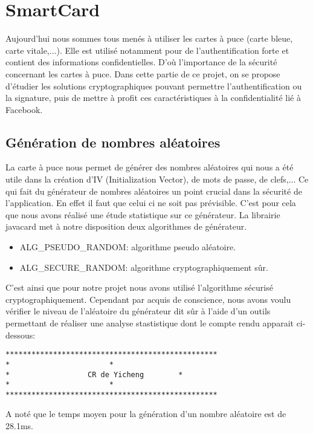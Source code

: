 \documentclass[a4paper,11pt,french]{article}
\begin{document}
\section{SmartCard}
Aujourd'hui nous sommes tous menés à utiliser les cartes à puce (carte bleue, carte vitale,...). 
Elle est utilisé notamment pour de l'authentification forte et contient des informations confidentielles.
D'où l'importance de la sécurité concernant les cartes à puce.
Dans cette partie de ce projet, on se propose d'étudier les solutions cryptographiques pouvant
permettre l'authentification ou la signature, puis de mettre à profit ces caractéristiques
à la confidentialité lié à Facebook.


\subsection{Génération de nombres aléatoires}
La carte à puce nous permet de générer des nombres aléatoires qui nous a été utile dans la création d'IV (Initialization Vector),
de mots de passe, de clefs,... Ce qui fait du générateur de nombres aléatoires un point crucial dans la sécurité de l'application.
En effet il faut que celui ci ne soit pas prévisible. C'est pour cela que nous avons réalisé une étude statistique sur ce générateur.
La librairie javacard met à notre disposition deux algorithmes de générateur. 
\begin{itemize} 
	\item ALG\_PSEUDO\_RANDOM: algorithme pseudo aléatoire.
	\item ALG\_SECURE\_RANDOM: algorithme cryptographiquement sûr.
\end{itemize}

C'est ainsi que pour notre projet nous avons utilisé l'algorithme sécurisé cryptographiquement. Cependant
par acquis de conscience, nous avons voulu vérifier le niveau de l'aléatoire du générateur dit sûr à l'aide d'un
outils permettant de réaliser une analyse stastistique dont le compte rendu apparait ci-dessous:

\begin{verbatim}
*************************************************
*						*
*                  CR de Yicheng		*
*						*
*************************************************
\end{verbatim}


A noté que le temps moyen pour la génération d'un nombre aléatoire est de 28.1ms.
\end{document}
